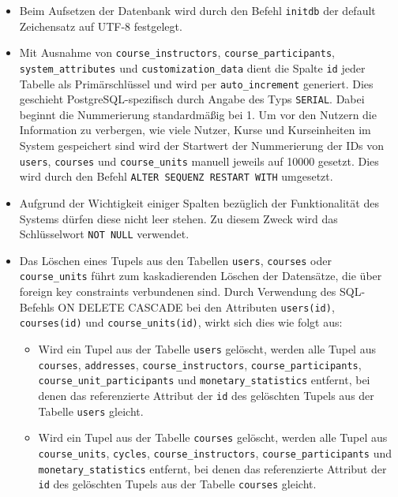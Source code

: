 \begin{itemize}
\item Beim Aufsetzen der Datenbank wird durch den Befehl \texttt{initdb} der default Zeichensatz auf UTF-8 festgelegt.

\item Mit Ausnahme von \texttt{course\_instructors}, \texttt{course\_participants}, \texttt{system\_attributes} und \texttt{customization\_data} dient die Spalte \texttt{id} jeder Tabelle als Primärschlüssel und wird per \texttt{auto\_increment} generiert. Dies geschieht PostgreSQL-spezifisch durch Angabe des Typs \texttt{SERIAL}. Dabei beginnt die Nummerierung standardmäßig bei 1. Um vor den Nutzern die Information zu verbergen, wie viele Nutzer, Kurse und Kurseinheiten im System gespeichert sind wird der Startwert der Nummerierung der IDs von \texttt{users}, \texttt{courses} und \texttt{course\_units} manuell jeweils auf 10000 gesetzt. Dies wird durch den Befehl \texttt{ALTER SEQUENZ RESTART WITH} umgesetzt.

\item Aufgrund der Wichtigkeit einiger Spalten bezüglich der Funktionalität des Systems dürfen diese nicht leer stehen. Zu diesem Zweck wird das Schlüsselwort \texttt{NOT NULL} verwendet.
\item Das Löschen eines Tupels aus den Tabellen \texttt{users}, \texttt{courses} oder \texttt{course\_units} führt zum kaskadierenden Löschen der Datensätze, die über foreign key constraints verbundenen sind. Durch Verwendung des SQL-Befehls ON DELETE CASCADE bei den Attributen \texttt{users(id)}, \texttt{courses(id)} und \texttt{course\_units(id)}, wirkt sich dies wie folgt aus:

\begin{itemize}
\item Wird ein Tupel aus der Tabelle \texttt{users} gelöscht, werden alle Tupel aus \texttt{courses}, \texttt{addresses}, \texttt{course\_instructors}, \texttt{course\_participants}, \texttt{course\_unit\_participants} und \texttt{monetary\_statistics} entfernt, bei denen das referenzierte Attribut der \texttt{id} des gelöschten Tupels aus der Tabelle \texttt{users} gleicht.

\item Wird ein Tupel aus der Tabelle \texttt{courses} gelöscht, werden alle Tupel aus \texttt{course\_units}, \texttt{cycles}, \texttt{course\_instructors}, \texttt{course\_participants} und \texttt{monetary\_statistics} entfernt, bei denen das referenzierte Attribut der \texttt{id} des gelöschten Tupels aus der Tabelle \texttt{courses} gleicht.


\end{itemize}
\end{itemize}
